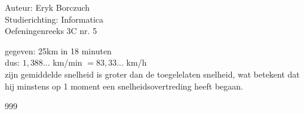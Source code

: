 \documentclass[a4paper]{article}
\begin{document}
  
\noindent \large Auteur: Eryk Borczuch \\
\noindent \large Studierichting: Informatica\\
\noindent \large Oefeningenreeks 3C nr. 5\\

\medskip

\normalsize

gegeven: 25km in 18 minuten\\

dus: $1,388...$ km/min $= 83,33...$ km/h\\

zijn gemiddelde snelheid is groter dan de toegelelaten snelheid, wat betekent dat hij minstens op 1 moment een snelheidsovertreding heeft begaan.

\begin{thebibliography}{999}
\end{thebibliography}
\end{document}
